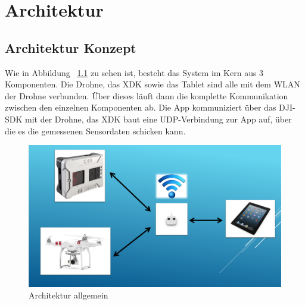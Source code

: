 
\chapter{Architektur}\label{cha:Architektur}
\section{Architektur Konzept}\label{sec:Architektur Konzept}
Wie in Abbildung ~\ref{fig:Architektur_grob} zu sehen ist, besteht das System im Kern aus 3 Komponenten. Die Drohne, das \acs{XDK} sowie das Tablet sind alle mit dem \acs{WLAN} der Drohne verbunden. Über dieses läuft dann die komplette Kommunikation zwischen den einzelnen Komponenten ab. Die App kommuniziert über das \acs{DJI}-\acs{SDK} mit der Drohne, das \acs{XDK} baut eine UDP-Verbindung zur App auf, über die es die gemessenen Sensordaten schicken kann.
\begin{figure}[H]
	\includegraphics[width=\textwidth]{images/Architektur_grob.png}	
	\caption{Architektur allgemein}
	\label{fig:Architektur_grob}
\end{figure}


